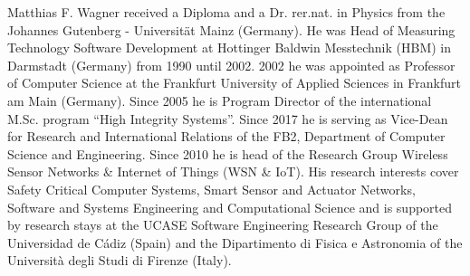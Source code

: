 \documentclass[10pt,journal,compsoc]{IEEEtran}
\begin{document}
\begin{IEEEbiography}{Matthias F. Wagner}
	 received a Diploma and a Dr. rer.nat. in Physics from the Johannes Gutenberg - Universität Mainz (Germany). He was Head of Measuring Technology Software Development at Hottinger Baldwin Messtechnik (HBM) in Darmstadt (Germany) from 1990 until 2002. 2002 he was appointed as Professor of Computer Science at the Frankfurt University of Applied Sciences in Frankfurt am Main (Germany). Since 2005 he is Program Director of the international M.Sc. program ``High Integrity Systems''. Since 2017 he is serving as Vice-Dean for Research and International Relations of the FB2, Department of Computer Science and Engineering. Since 2010 he is head of the Research Group Wireless Sensor Networks \& Internet of Things (WSN \& IoT). His research interests cover Safety Critical Computer Systems, Smart Sensor and Actuator Networks, Software and Systems Engineering and Computational Science and is supported by research stays at the UCASE Software Engineering Research Group of the Universidad de C\'adiz (Spain) and the Dipartimento di Fisica e Astronomia of the Università degli Studi di Firenze (Italy). 
\end{IEEEbiography}
\end{document}

